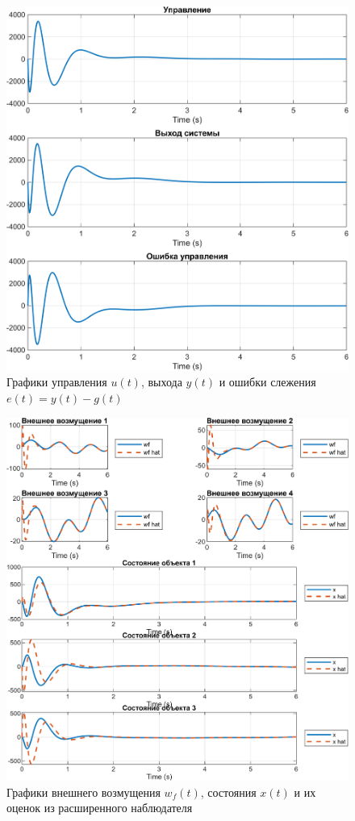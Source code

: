 \begin{figure}[H]
    \centering
    \includegraphics[width=\linewidth]{figs/20_sim.png}
    \caption{Графики управления $u(t)$, выхода $y(t)$ и ошибки слежения
    $e(t)=y(t)-g(t)$}
    \label{fig:20}
\end{figure}

\begin{figure}[H]
    \centering
    \includegraphics[width=\linewidth]{figs/21_sim.png}
    \caption{Графики внешнего возмущения $w_f(t)$, состояния $x(t)$ и их оценок
    из расширенного наблюдателя}
    \label{fig:21}
\end{figure}

